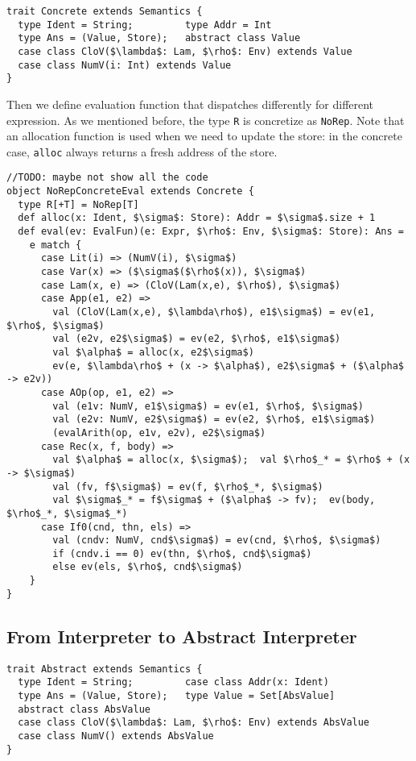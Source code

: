\begin{lstlisting}
trait Concrete extends Semantics {
  type Ident = String;         type Addr = Int
  type Ans = (Value, Store);   abstract class Value
  case class CloV($\lambda$: Lam, $\rho$: Env) extends Value
  case class NumV(i: Int) extends Value
}
\end{lstlisting}

Then we define evaluation function that dispatches differently for different expression.
As we mentioned before, the type \texttt{R} is concretize as \texttt{NoRep}.
Note that an allocation function is used when we need to update the store: 
in the concrete case, \texttt{alloc} always returns a fresh address of the store.

\begin{lstlisting}
//TODO: maybe not show all the code
object NoRepConcreteEval extends Concrete {
  type R[+T] = NoRep[T]
  def alloc(x: Ident, $\sigma$: Store): Addr = $\sigma$.size + 1
  def eval(ev: EvalFun)(e: Expr, $\rho$: Env, $\sigma$: Store): Ans = 
    e match {
      case Lit(i) => (NumV(i), $\sigma$)
      case Var(x) => ($\sigma$($\rho$(x)), $\sigma$)
      case Lam(x, e) => (CloV(Lam(x,e), $\rho$), $\sigma$)
      case App(e1, e2) =>
        val (CloV(Lam(x,e), $\lambda\rho$), e1$\sigma$) = ev(e1, $\rho$, $\sigma$)
        val (e2v, e2$\sigma$) = ev(e2, $\rho$, e1$\sigma$)
        val $\alpha$ = alloc(x, e2$\sigma$)
        ev(e, $\lambda\rho$ + (x -> $\alpha$), e2$\sigma$ + ($\alpha$ -> e2v))
      case AOp(op, e1, e2) =>
        val (e1v: NumV, e1$\sigma$) = ev(e1, $\rho$, $\sigma$)
        val (e2v: NumV, e2$\sigma$) = ev(e2, $\rho$, e1$\sigma$)
        (evalArith(op, e1v, e2v), e2$\sigma$)
      case Rec(x, f, body) => 
        val $\alpha$ = alloc(x, $\sigma$);  val $\rho$_* = $\rho$ + (x -> $\sigma$)
        val (fv, f$\sigma$) = ev(f, $\rho$_*, $\sigma$)
        val $\sigma$_* = f$\sigma$ + ($\alpha$ -> fv);  ev(body, $\rho$_*, $\sigma$_*)
      case If0(cnd, thn, els) =>
        val (cndv: NumV, cnd$\sigma$) = ev(cnd, $\rho$, $\sigma$)
        if (cndv.i == 0) ev(thn, $\rho$, cnd$\sigma$)
        else ev(els, $\rho$, cnd$\sigma$)
    }
}
\end{lstlisting}

\subsection{From Interpreter to Abstract Interpreter}

\begin{lstlisting}
trait Abstract extends Semantics {
  type Ident = String;         case class Addr(x: Ident)
  type Ans = (Value, Store);   type Value = Set[AbsValue]
  abstract class AbsValue
  case class CloV($\lambda$: Lam, $\rho$: Env) extends AbsValue
  case class NumV() extends AbsValue
}
\end{lstlisting}

